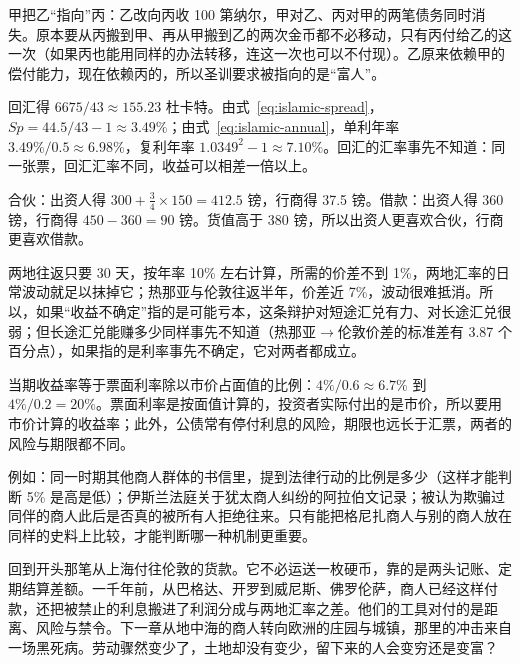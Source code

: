 \begin{answers}
\item 甲把乙“指向”丙：乙改向丙收 100 第纳尔，甲对乙、丙对甲的两笔债务同时消失。原本要从丙搬到甲、再从甲搬到乙的两次金币都不必移动，只有丙付给乙的这一次（如果丙也能用同样的办法转移，连这一次也可以不付现）。乙原来依赖甲的偿付能力，现在依赖丙的，所以圣训要求被指向的是“富人”。
\item 回汇得 $6675/43\approx155.23$ 杜卡特。由式~\eqref{eq:islamic-spread}，$Sp=44.5/43-1\approx3.49\%$；由式~\eqref{eq:islamic-annual}，单利年率 $3.49\%/0.5\approx6.98\%$，复利年率 $1.0349^2-1\approx7.10\%$。回汇的汇率事先不知道：同一张票，回汇汇率不同，收益可以相差一倍以上。
\item 合伙：出资人得 $300+\tfrac34\times150=412.5$ 镑，行商得 37.5 镑。借款：出资人得 360 镑，行商得 $450-360=90$ 镑。货值高于 380 镑，所以出资人更喜欢合伙，行商更喜欢借款。
\item 两地往返只要 30 天，按年率 10\% 左右计算，所需的价差不到 1\%，两地汇率的日常波动就足以抹掉它；热那亚与伦敦往返半年，价差近 7\%，波动很难抵消。所以，如果“收益不确定”指的是可能亏本，这条辩护对短途汇兑有力、对长途汇兑很弱；但长途汇兑能赚多少同样事先不知道（热那亚$\to$伦敦价差的标准差有 3.87 个百分点），如果指的是利率事先不确定，它对两者都成立。
\item 当期收益率等于票面利率除以市价占面值的比例：$4\%/0.6\approx6.7\%$ 到 $4\%/0.2=20\%$。票面利率是按面值计算的，投资者实际付出的是市价，所以要用市价计算的收益率；此外，公债常有停付利息的风险，期限也远长于汇票，两者的风险与期限都不同。
\item 例如：同一时期其他商人群体的书信里，提到法律行动的比例是多少（这样才能判断 5\% 是高是低）；伊斯兰法庭关于犹太商人纠纷的阿拉伯文记录；被认为欺骗过同伴的商人此后是否真的被所有人拒绝往来。只有能把格尼扎商人与别的商人放在同样的史料上比较，才能判断哪一种机制更重要。
\end{answers}

回到开头那笔从上海付往伦敦的货款。它不必运送一枚硬币，靠的是两头记账、定期结算差额。一千年前，从巴格达、开罗到威尼斯、佛罗伦萨，商人已经这样付款，还把被禁止的利息搬进了利润分成与两地汇率之差。他们的工具对付的是距离、风险与禁令。下一章从地中海的商人转向欧洲的庄园与城镇，那里的冲击来自一场黑死病。劳动骤然变少了，土地却没有变少，留下来的人会变穷还是变富？
